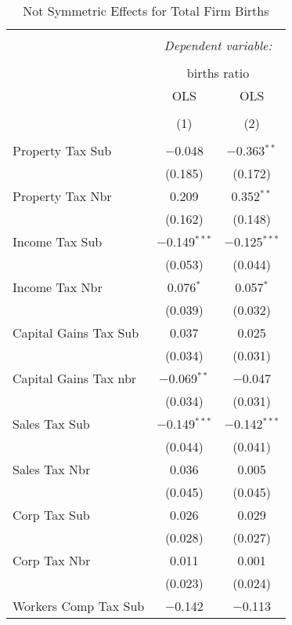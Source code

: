 
\begin{table}[!htbp] \centering 
  \caption{Not Symmetric Effects for  Total Firm Births} 
  \label{--noequality} 
\footnotesize 
\begin{tabular}{@{\extracolsep{5pt}}lcc} 
\\[-1.8ex]\hline 
\hline \\[-1.8ex] 
 & \multicolumn{2}{c}{\textit{Dependent variable:}} \\ 
\cline{2-3} 
\\[-1.8ex] & \multicolumn{2}{c}{births ratio} \\ 
 & OLS & OLS \\ 
\\[-1.8ex] & (1) & (2)\\ 
\hline \\[-1.8ex] 
 Property Tax Sub & $-$0.048 & $-$0.363$^{**}$ \\ 
  & (0.185) & (0.172) \\ 
  Property Tax Nbr & 0.209 & 0.352$^{**}$ \\ 
  & (0.162) & (0.148) \\ 
  Income Tax Sub & $-$0.149$^{***}$ & $-$0.125$^{***}$ \\ 
  & (0.053) & (0.044) \\ 
  Income Tax Nbr & 0.076$^{*}$ & 0.057$^{*}$ \\ 
  & (0.039) & (0.032) \\ 
  Capital Gains Tax Sub & 0.037 & 0.025 \\ 
  & (0.034) & (0.031) \\ 
  Capital Gains Tax nbr & $-$0.069$^{**}$ & $-$0.047 \\ 
  & (0.034) & (0.031) \\ 
  Sales Tax Sub & $-$0.149$^{***}$ & $-$0.142$^{***}$ \\ 
  & (0.044) & (0.041) \\ 
  Sales Tax Nbr & 0.036 & 0.005 \\ 
  & (0.045) & (0.045) \\ 
  Corp Tax Sub & 0.026 & 0.029 \\ 
  & (0.028) & (0.027) \\ 
  Corp Tax Nbr & 0.011 & 0.001 \\ 
  & (0.023) & (0.024) \\ 
  Workers Comp Tax Sub & $-$0.142 & $-$0.113 \\ 

\end{tabular}
\end{table}
